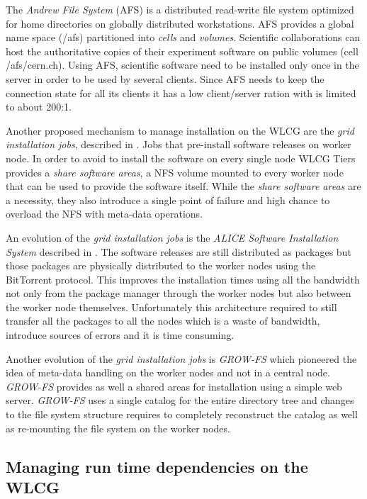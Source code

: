 The \textit{Andrew File System} \cite{andrew} (AFS) is a distributed read-write
file system optimized for home directories on globally distributed
workstations. AFS provides a global name space (/afs) partitioned into
\textit{cells} and \textit{volumes}. Scientific collaborations can host the
authoritative copies of their experiment software on public volumes (cell
/afs/cern.ch). Using AFS, scientific software need to be installed only once in
the server in order to be used by several clients.  Since AFS needs to keep the
connection state for all its clients it has a low client/server ration with is
limited to about 200:1.

Another proposed mechanism to manage installation on the WLCG are the
\textit{grid installation jobs}, described in \cite{jakob:cvmfs}. Jobs that
pre-install software releases on worker node. In order to avoid to install the
software on every single node WLCG Tiers provides a \textit{share software
areas}, a NFS volume mounted to every worker node that can be used to provide
the software itself. While the \textit{share software areas} are a necessity,
they also introduce a single point of failure and high chance to overload the
NFS with meta-data operations.

An evolution of the \textit{grid installation jobs} is the \textit{ALICE
Software Installation System} described in \cite{jakob:cvmfs}. The software
releases are still distributed as packages but those packages are physically
distributed to the worker nodes using the BitTorrent protocol. This improves
the installation times using all the bandwidth not only from the package
manager through the worker nodes but also between the worker node themselves.
Unfortunately this architecture required to still transfer all the packages to
all the nodes which is a waste of bandwidth, introduce sources of errors and it
is time consuming.

Another evolution of the \textit{grid installation jobs} is \textit{GROW-FS}
\cite{grow-fs} which pioneered the idea of meta-data handling on the worker
nodes and not in a central node. \textit{GROW-FS} provides as well a shared
areas for installation using a simple web server. \textit{GROW-FS} uses a
single catalog for the entire directory tree and changes to the file system
structure requires to completely reconstruct the catalog as well as re-mounting
the file system on the worker nodes.

\subsection{Managing run time dependencies on the WLCG} \label{subsec:soaruntime}


